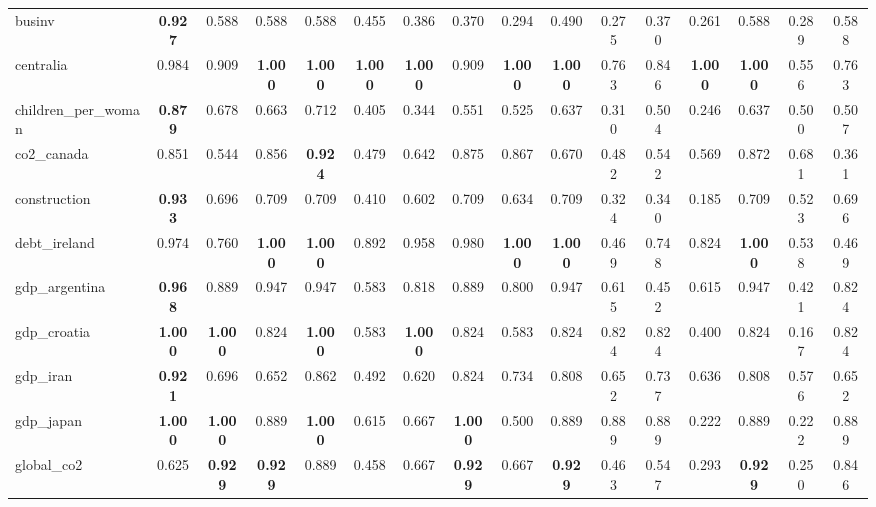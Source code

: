 \begin{table}
{\begin{tabular}{l|c|cccccccccccccc}
    businv & \textbf{0.927} & 0.588 & 0.588 & 0.588 & 0.455 & 0.386 & 0.370 & 0.294 & 0.490 & 0.275 & 0.370 & 0.261 & 0.588 & 0.289 & 0.588\\
    centralia & 0.984 & 0.909 & \textbf{1.000} & \textbf{1.000} & \textbf{1.000} & \textbf{1.000} & 0.909 & \textbf{1.000} & \textbf{1.000} & 0.763 & 0.846 & \textbf{1.000} & \textbf{1.000} & 0.556 & 0.763\\
    children\_per\_woman & \textbf{0.879} & 0.678 & 0.663 & 0.712 & 0.405 & 0.344 & 0.551 & 0.525 & 0.637 & 0.310 & 0.504 & 0.246 & 0.637 & 0.500 & 0.507\\
    
    co2\_canada & 0.851 & 0.544 & 0.856 & \textbf{0.924} & 0.479 & 0.642 & 0.875 & 0.867 & 0.670 & 0.482 & 0.542 & 0.569 & 0.872 & 0.681 & 0.361\\
    
    construction & \textbf{0.933} & 0.696 & 0.709 & 0.709 & 0.410 & 0.602 & 0.709 & 0.634 & 0.709 & 0.324 & 0.340 & 0.185 & 0.709 & 0.523 & 0.696\\
    
    debt\_ireland & 0.974 & 0.760 & \textbf{1.000} & \textbf{1.000} & 0.892 & 0.958 & 0.980 & \textbf{1.000} & \textbf{1.000} & 0.469 & 0.748 & 0.824 & \textbf{1.000} & 0.538 & 0.469\\
    
    gdp\_argentina & \textbf{0.968} & 0.889 & 0.947 & 0.947 & 0.583 & 0.818 & 0.889 & 0.800 & 0.947 & 0.615 & 0.452 & 0.615 & 0.947 & 0.421 & 0.824\\
    
    gdp\_croatia & \textbf{1.000} & \textbf{1.000} & 0.824 & \textbf{1.000} & 0.583 & \textbf{1.000} & 0.824 & 0.583 & 0.824 & 0.824 & 0.824 & 0.400 & 0.824 & 0.167 & 0.824\\
    
    gdp\_iran & \textbf{0.921} & 0.696 & 0.652 & 0.862 & 0.492 & 0.620 & 0.824 & 0.734 & 0.808 & 0.652 & 0.737 & 0.636 & 0.808 & 0.576 & 0.652\\
    
    gdp\_japan & \textbf{1.000} & \textbf{1.000} & 0.889 & \textbf{1.000} & 0.615 & 0.667 & \textbf{1.000} & 0.500 & 0.889 & 0.889 & 0.889 & 0.222 & 0.889 & 0.222 & 0.889\\
    
    global\_co2 & 0.625 & \textbf{0.929} & \textbf{0.929} & 0.889 & 0.458 & 0.667 & \textbf{0.929} & 0.667 & \textbf{0.929} & 0.463 & 0.547 & 0.293 & \textbf{0.929} & 0.250 & 0.846\\
    

\end{tabular}}
\end{table}
